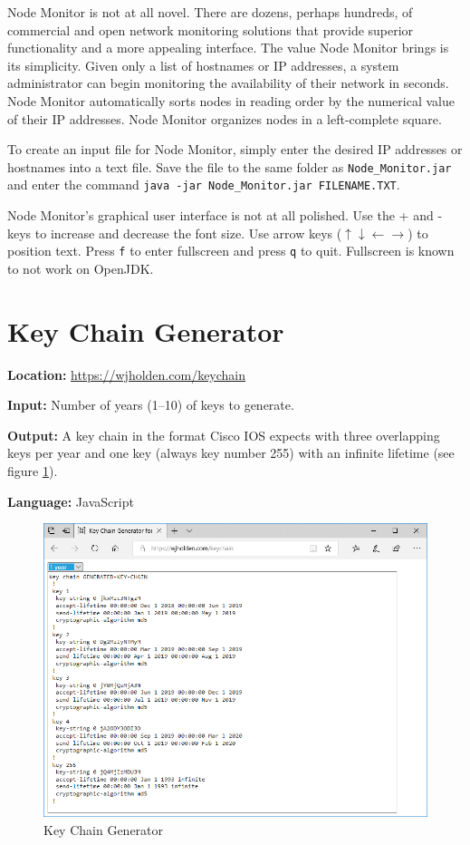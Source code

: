 \documentclass[12pt]{article}
\begin{document}
Node Monitor is not at all novel. There are dozens, perhaps hundreds, of commercial and open network monitoring solutions that provide superior functionality and a more appealing interface. The value Node Monitor brings is its simplicity. Given only a list of hostnames or IP addresses, a system administrator can begin monitoring the availability of their network in seconds. Node Monitor automatically sorts nodes in reading order by the numerical value of their IP addresses. Node Monitor organizes nodes in a left-complete square.

To create an input file for Node Monitor, simply enter the desired IP addresses or hostnames into a text file. Save the file to the same folder as \texttt{Node\_Monitor.jar} and enter the command \texttt{java -jar Node\_Monitor.jar FILENAME.TXT}.

Node Monitor's graphical user interface is not at all polished. Use the + and - keys to increase and decrease the font size. Use arrow keys ($\uparrow\downarrow\leftarrow\rightarrow$) to position text. Press \texttt{f} to enter fullscreen and press \texttt{q} to quit. Fullscreen is known to not work on OpenJDK.

\section{Key Chain Generator} \label{sec:KeyChain}

\noindent \textbf{Location:} \url{https://wjholden.com/keychain}

\noindent \textbf{Input:} Number of years (1--10) of keys to generate.

\noindent \textbf{Output:} A key chain in the format Cisco IOS expects with three overlapping keys per year and one key (always key number 255) with an infinite lifetime (see figure \ref{fig:keychain}).

\noindent \textbf{Language:} JavaScript

\begin{figure}[h]
\centering
\includegraphics[width=.80\textwidth]{Key-Chain}
\caption{Key Chain Generator}
\label{fig:keychain}
\end{figure}
\end{document}
